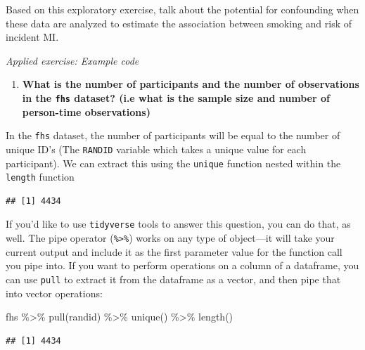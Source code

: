 \documentclass[
]{book}
\newenvironment{Shaded}{\begin{snugshade}}{\end{snugshade}}
\newcommand{\FunctionTok}[1]{\textcolor[rgb]{0.00,0.00,0.00}{#1}}
\newcommand{\NormalTok}[1]{#1}
\newcommand{\SpecialCharTok}[1]{\textcolor[rgb]{0.00,0.00,0.00}{#1}}
\providecommand{\tightlist}{%
  \setlength{\itemsep}{0pt}\setlength{\parskip}{0pt}}
\begin{document}
Based on this exploratory exercise, talk about the potential
for confounding when these data are analyzed to estimate the association between
smoking and risk of incident MI.

\emph{Applied exercise: Example code}

\begin{enumerate}
\def\labelenumi{\arabic{enumi}.}
\tightlist
\item
  \textbf{What is the number of participants and the number of observations in the \texttt{fhs} dataset? (i.e what is the sample size and number of person-time observations)}
\end{enumerate}

In the \texttt{fhs} dataset, the number of participants will be equal to the number of unique ID's (The \texttt{RANDID} variable which takes a unique value for each participant). We can extract this using the \texttt{unique} function nested within the \texttt{length} function

\begin{Shaded}
\end{Shaded}

\begin{verbatim}
## [1] 4434
\end{verbatim}

If you'd like to use \texttt{tidyverse} tools to answer this question, you can do
that, as well. The pipe operator (\texttt{\%\textgreater{}\%}) works on any type of object---it will
take your current output and include it as the first parameter value for the
function call you pipe into. If you want to perform operations on a column of
a dataframe, you can use \texttt{pull} to extract it from the dataframe as a vector, and
then pipe that into vector operations:

\begin{Shaded}
\begin{Highlighting}[]
\NormalTok{fhs }\SpecialCharTok{\%\textgreater{}\%} 
  \FunctionTok{pull}\NormalTok{(randid) }\SpecialCharTok{\%\textgreater{}\%} 
  \FunctionTok{unique}\NormalTok{() }\SpecialCharTok{\%\textgreater{}\%} 
  \FunctionTok{length}\NormalTok{()}
\end{Highlighting}
\end{Shaded}

\begin{verbatim}
## [1] 4434
\end{verbatim}
\end{document}
